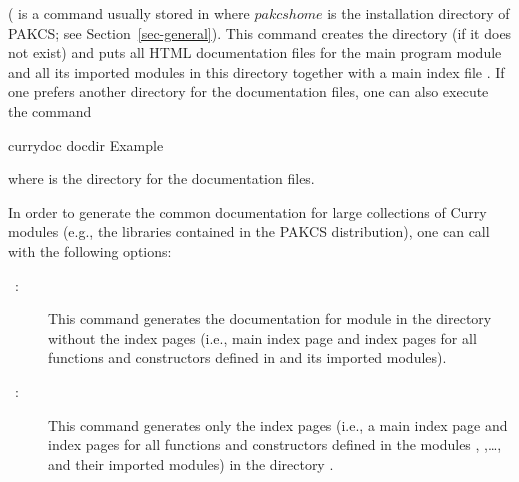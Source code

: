 ( is a command usually stored in 
where $pakcshome$ is the installation directory of PAKCS;
see Section~\ref{sec-general}).
This command creates the directory  (if it does not exist)
and puts all HTML documentation files for the main program module
and all its imported modules in this directory together with
a main index file .
If one prefers another directory for the documentation files,
one can also execute the command
\begin{curry}
currydoc docdir Example
\end{curry}
where  is the directory for the documentation files.

In order to generate the common documentation for large collections
of Curry modules (e.g., the libraries contained in the PAKCS distribution),
one can call  with the following options:
\begin{description}
\item[~:]
This command generates the documentation for module 
in the directory  without the index pages (i.e., main index page
and index pages for all functions and constructors defined in 
and its imported modules).
\item[~:]
This command generates only the index pages (i.e., a main index page
and index pages for all functions and constructors defined in the modules
, ,\ldots, and their imported modules)
in the directory .
\end{description}

